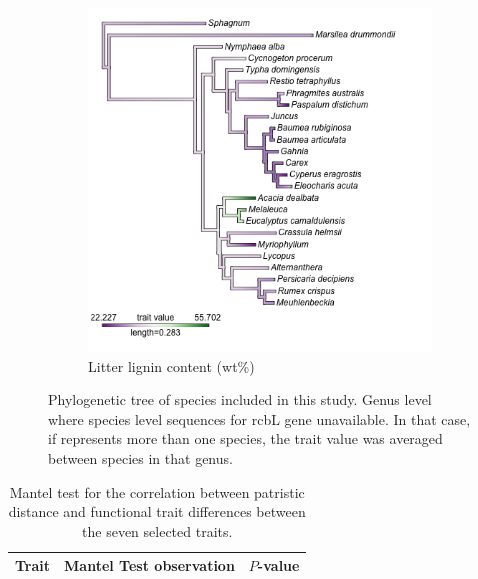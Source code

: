 \documentclass{article}
\begin{document}
\begin{figure}[htb]\ContinuedFloat
    \centering
	\begin{subfigure}[h]{0.7\textwidth}
		\includegraphics[width=\linewidth]{figs/phylo_LG.png}
		\caption{Litter lignin content (wt\%)}
		\label{Fig:phyLG}
	\end{subfigure} %
	\caption{Phylogenetic tree of species included in this study. Genus level where species level sequences for rcbL gene unavailable. In that case, if represents more than one species, the trait value was averaged between species in that genus.}
\end{figure}	
	
\begin{table}[ht] \centering 
	\caption{Mantel test for the correlation between patristic distance and functional trait differences between the seven selected traits.} 
	\label{Tab:mantel} 
	\begin{tabular}{l r r} 
	\toprule
		Trait & Mantel Test observation & $P$-value \\ 
		\midrule 
		
		\bottomrule
	\end{tabular} 
\end{table} 
	
\end{document}
